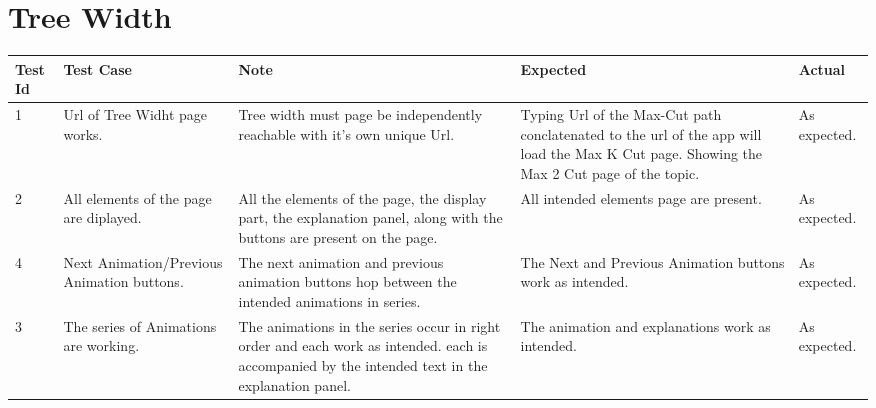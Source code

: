 \section{Tree Width}
\begin{tabular}{ |p{1cm}|p{2cm}|p{4cm}|p{2cm}|p{2cm}| }
 \hline
 \textbf{Test Id} & \textbf{Test Case} & \textbf{Note} & \textbf{Expected} & \textbf{Actual} \\
 \hline
 1 
 & Url of Tree Widht page works. 
 & Tree width must page be independently reachable with it's own unique
   Url.
 & Typing Url of the Max-Cut path conclatenated to the url of the app will load the
   Max K Cut page. Showing the Max 2 Cut page of the topic.
 & As expected. \\
 \hline
 2 
 & All elements of the page are diplayed.
 & All the elements of the page, the display part, the explanation panel, along with the
   buttons are present on the page.
 & All intended elements page are present.
 & As expected. \\
 \hline
 4 
 & Next Animation/Previous Animation buttons.
 & The next animation and previous animation buttons hop between the intended animations
   in series.
 & The Next and Previous Animation buttons work as intended.
 & As expected. \\
 \hline
 3 
 & The series of Animations are working.
 & The animations in the series occur in right order and each work as intended. 
   each is accompanied by the intended text in the explanation panel.
 & The animation and explanations work as intended.
 & As expected. \\
 \hline
\end{tabular}

